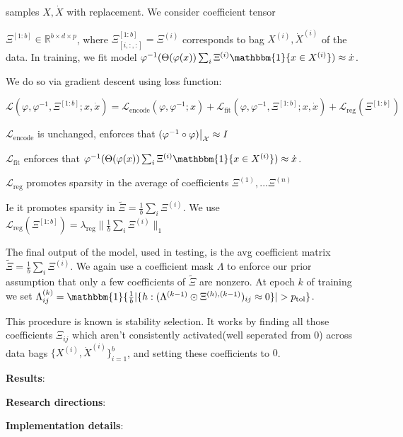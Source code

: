 \documentclass[11pt]{article}
\newcommand{\indi}{\mathbbm{1}}
\newcommand{\R}{\mathbb{R}}
\newcommand{\tb}{\textbf}
\newcommand{\norm}[2]{\| #1 \|_{#2}}
\newcommand{\restrict}[2]{#1\big{|}_{#2}}
\begin{document}
 samples $X,\dot{X}$ with replacement. 
  We consider coefficient tensor 
  
  $\Xi^{[1:b]} \in \R^{b \times d \times p}$,  where $\Xi^{[1:b]}_{[i,:,:]} = \Xi^{(i)}$ 
 corresponds to bag $X^{(i)},\dot{X}^{(i)}$ of the data.  In training,  we fit model
   $\varphi^{-1}(\Theta(\varphi(x))\sum_{i} \Xi^{(i)}\indi\{x \in X^{(i)}\}) \approx \dot{x}$.
 
 
 We do so via gradient descent using loss function:
 
 $\mathcal{L}(\varphi, \varphi^{-1}, \Xi^{[1:b]} ; x ,\dot{x}) = \mathcal{L}_\text{encode}(\varphi, \varphi^{-1}; x) + \mathcal{L}_\text{fit}(\varphi, \varphi^{-1},\Xi^{[1:b]}; x,\dot{x}) + \mathcal{L}_\text{reg}(\Xi^{[1:b]})$
 
  $\mathcal{L}_\text{encode}$ is unchanged, enforces that $\restrict{(\varphi^{-1} \circ \varphi)}{\mathcal{X}} \approx  I$
 
 
  $\mathcal{L}_\text{fit}$ enforces that    $\varphi^{-1}(\Theta(\varphi(x))\sum_{i} \Xi^{(i)}\indi\{x \in X^{(i)}\}) \approx \dot{x}$.
  
  
   $\mathcal{L}_\text{reg}$ promotes sparsity in the average of coefficients  $\Xi^{(1)},...\Xi^{(n)}$
   
    Ie it promotes sparsity in   $\tilde{\Xi} = \frac{1}{b}\sum_{i} \Xi^{(i)}$.
     We use $\mathcal{L}_\text{reg}(\Xi^{[1:b]}) = \lambda_\text{reg}\norm{\frac{1}{b}\sum_{i} \Xi^{(i)}}{1}$
 
 
 The final output of the model, used in testing,  is the avg coefficient matrix  $\tilde{\Xi} = \frac{1}{b}\sum_{i} \Xi^{(i)}$.  We again use a coefficient mask $\Lambda$ to enforce our prior assumption that only a few coefficients of $\tilde{\Xi}$ are nonzero. 
 At epoch $k$ of training we set $\Lambda ^{(k)}_{ij} = \indi\{\frac{1}{b}
  | \{h : (\Lambda ^{(k-1)}\odot \Xi^{(h),(k-1)})_{ij} \approx 0\}| > p_\text{tol} \}$.
  
  This procedure is known is stability selection.  It works by finding  all those coefficients $\Xi_{ij}$ which aren't consistently activated(well seperated from 0) across data bags $\{X^{(i)},  \dot{X}^{(i)}\}_{i=1}^b$,   and setting these coefficients to $0$.
  
  \pagebreak
 
 \tb{Results}:
 
 
 \pagebreak
 
 
 \tb{Research directions}:
  
  
  
  \pagebreak
  
  
  \tb{Implementation details}:
  
 \pagebreak
 
  
\end{document}
